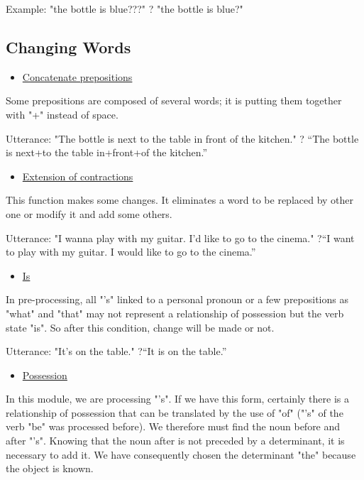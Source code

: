 \documentclass[twoside,a4paper,10pt]{report}
\begin{document}
Example: "the bottle is blue???" ? "the bottle is blue?"


\subsection{Changing Words}
\label{179d018d9e72e2699a66b97a27313146}%

\begin{itemize}
    \item  \underline{Concatenate prepositions}
\end{itemize}
Some prepositions are composed of several words; it is putting them together with "+" instead of space.


\small
\begin{verbatimtab}
  Utterance: "The bottle is next to the table in front of the kitchen."
  ? “The bottle is next+to the table in+front+of the kitchen.”
\end{verbatimtab}
\normalsize

\begin{itemize}
    \item  \underline{Extension of contractions}
\end{itemize}
This function makes some changes. It eliminates a word to be replaced by other one or modify it and add some others.


\small
\begin{verbatimtab}
  Utterance: "I wanna play with my guitar. I'd like to go to the cinema."
  ?“I want to play with my guitar. I would like to go to the cinema.”
\end{verbatimtab}
\normalsize

\begin{itemize}
    \item  \underline{Is}
\end{itemize}
In pre-processing, all "’s" linked to a personal pronoun or a few prepositions as "what" and "that" may not represent a relationship of possession but the verb state "is". So after this condition, change will be made or not.


\small
\begin{verbatimtab}
  Utterance: "It's on the table."
  ?“It is on the table.” 
\end{verbatimtab}
\normalsize

\begin{itemize}
    \item  \underline{Possession}
\end{itemize}
In this module, we are processing "’s". If we have this form, certainly there is a relationship of possession that can be translated by the use of "of" ("’s" of the verb "be" was processed before). We therefore must find the noun before and after "’s". Knowing that the noun after is not preceded by a determinant, it is necessary to add it. We have consequently chosen the determinant "the" because the object is known.
\end{document}
